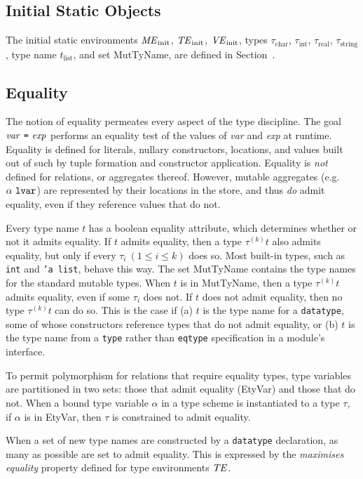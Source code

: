 \subsection{Initial Static Objects}
The initial static environments $\mbox{\textit{ME}}_{\mathrm{init}}$, $\mbox{\textit{TE}}_{\mathrm{init}}$,
$\mbox{\textit{VE}}_{\mathrm{init}}$, types $\tau_{\mathrm{char}}$, $\tau_{\mathrm{int}}$,
$\tau_{\mathrm{real}}$, $\tau_{\mathrm{string}}$,
type name $t_{\mathrm{list}}$, and set MutTyName,
are defined in Section~.
%
\subsection{Equality}
The notion of equality permeates every aspect of the type discipline.
The goal $\mbox{\textit{var}}~\mbox{\texttt{=}}~\mbox{\textit{exp}}$ performs an equality
test of the values of \emph{var} and \emph{exp} at runtime.
Equality is defined for literals, nullary constructors, locations,
and values built out of such by tuple formation and constructor application.
Equality is \emph{not} defined for relations, or aggregates thereof.
However, mutable aggregates (e.g. $\alpha~\mbox{\texttt{lvar}}$) are
represented by their locations in the store, and thus \emph{do} admit
equality, even if they reference values that do not.

Every type name $t$ has a boolean equality attribute,
which determines whether or not it admits equality.
If $t$ admits equality, then a type $\tau^{(k)}t$ also admits equality,
but only if every $\tau_i ~(1\leq i\leq k)$ does so.
Most built-in types, such as \texttt{int} and \texttt{'a list}, behave this way.
The set MutTyName contains the type names for the standard mutable types.
When $t$ is in MutTyName, then a type $\tau^{(k)}t$ admits equality,
even if some $\tau_i$ does not.
If $t$ does not admit equality, then no type $\tau^{(k)}t$ can do so.
This is the case if (a) $t$ is the type name for a \texttt{datatype},
some of whose constructors reference types that do not admit equality,
or (b) $t$ is the type name from a \texttt{type} rather than \texttt{eqtype}
specification in a module's interface.

To permit polymorphism for relations that require equality types,
type variables are partitioned in two sets: those that admit equality
(EtyVar) and those that do not.
When a bound type variable $\alpha$ in a type scheme is instantiated to
a type $\tau$, if $\alpha$ is in EtyVar, then $\tau$ is constrained
to admit equality.

When a set of new type names are constructed by a \texttt{datatype} declaration,
as many as possible are set to admit equality. This is expressed by the
\emph{maximises equality} property defined for type environments $\mbox{\textit{TE}}$.
%

